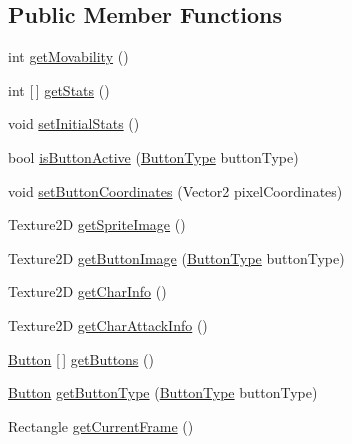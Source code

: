 \subsection*{Public Member Functions}
\begin{DoxyCompactItemize}
\item 
int \hyperlink{interface_model_1_1_unit_module_1_1_unit_a670aae31f46980c871774352f5fe3a3f}{get\+Movability} ()
\item 
int \mbox{[}$\,$\mbox{]} \hyperlink{interface_model_1_1_unit_module_1_1_unit_a32890c6e0bf19a58dde71cc4240576a8}{get\+Stats} ()
\item 
void \hyperlink{interface_model_1_1_unit_module_1_1_unit_a3b67c1b9e929a9f7d4191de20996220a}{set\+Initial\+Stats} ()
\item 
bool \hyperlink{interface_model_1_1_unit_module_1_1_unit_a3931ef1523507e7261411dc79ee4e4af}{is\+Button\+Active} (\hyperlink{namespace_model_ac76b3489c9d704f49912608bd36cd0e7}{Button\+Type} button\+Type)
\item 
void \hyperlink{interface_model_1_1_unit_module_1_1_unit_ad48776b3bd231bf80d2eec87b7498302}{set\+Button\+Coordinates} (Vector2 pixel\+Coordinates)
\item 
Texture2D \hyperlink{interface_model_1_1_unit_module_1_1_unit_a797013e0463ea2e8c9ae8171f7d305f0}{get\+Sprite\+Image} ()
\item 
Texture2D \hyperlink{interface_model_1_1_unit_module_1_1_unit_ac8e47a3f8d13fe8a719f962a3ee9ee46}{get\+Button\+Image} (\hyperlink{namespace_model_ac76b3489c9d704f49912608bd36cd0e7}{Button\+Type} button\+Type)
\item 
Texture2D \hyperlink{interface_model_1_1_unit_module_1_1_unit_a4e2aeae552d85c8938e609729bcd1a44}{get\+Char\+Info} ()
\item 
Texture2D \hyperlink{interface_model_1_1_unit_module_1_1_unit_a7c89d9a1dc648b556b7e57cdcdbf2930}{get\+Char\+Attack\+Info} ()
\item 
\hyperlink{class_model_1_1_button}{Button} \mbox{[}$\,$\mbox{]} \hyperlink{interface_model_1_1_unit_module_1_1_unit_a5256d2141e9c59e0454e47ac65246bda}{get\+Buttons} ()
\item 
\hyperlink{class_model_1_1_button}{Button} \hyperlink{interface_model_1_1_unit_module_1_1_unit_a6e9528d09bca7702fe99cc95135ede36}{get\+Button\+Type} (\hyperlink{namespace_model_ac76b3489c9d704f49912608bd36cd0e7}{Button\+Type} button\+Type)
\item 
Rectangle \hyperlink{interface_model_1_1_unit_module_1_1_unit_accb79e396c6066707f2d11f63e3fdd99}{get\+Current\+Frame} ()

\end{DoxyCompactItemize}
